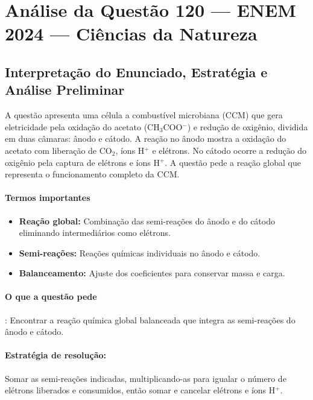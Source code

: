 \documentclass{article}
\begin{document}
\section*{Análise da Questão 120 — ENEM 2024 — Ciências da Natureza}

\subsection*{Interpretação do Enunciado, Estratégia e Análise Preliminar}
A questão apresenta uma célula a combustível microbiana (CCM) que gera eletricidade pela oxidação do acetato (CH$_3$COO$^-$) e redução de oxigênio, dividida em duas câmaras: ânodo e cátodo. A reação no ânodo mostra a oxidação do acetato com liberação de CO$_2$, íons H$^+$ e elétrons. No cátodo ocorre a redução do oxigênio pela captura de elétrons e íons H$^+$. A questão pede a reação global que representa o funcionamento completo da CCM.

\paragraph{Termos importantes}
\begin{itemize}
  \item \textbf{Reação global:} Combinação das semi-reações do ânodo e do cátodo eliminando intermediários como elétrons.
  \item \textbf{Semi-reações:} Reações químicas individuais no ânodo e cátodo.
  \item \textbf{Balanceamento:} Ajuste dos coeficientes para conservar massa e carga.
\end{itemize}

\paragraph{O que a questão pede}:
Encontrar a reação química global balanceada que integra as semi-reações do ânodo e cátodo.

\paragraph{Estratégia de resolução:}
Somar as semi-reações indicadas, multiplicando-as para igualar o número de elétrons liberados e consumidos, então somar e cancelar elétrons e íons H$^+$.
\end{document}
